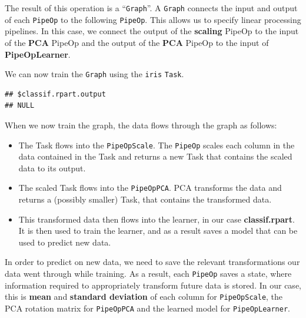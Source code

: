 \documentclass[]{scrbook}
\newenvironment{Shaded}{\begin{snugshade}}{\end{snugshade}}
\newcommand{\KeywordTok}[1]{\textcolor[rgb]{0.13,0.29,0.53}{\textbf{#1}}}
\newcommand{\NormalTok}[1]{#1}
\newcommand{\OperatorTok}[1]{\textcolor[rgb]{0.81,0.36,0.00}{\textbf{#1}}}
\newcommand{\StringTok}[1]{\textcolor[rgb]{0.31,0.60,0.02}{#1}}
\providecommand{\tightlist}{%
  \setlength{\itemsep}{0pt}\setlength{\parskip}{0pt}}
\renewenvironment{Shaded} {\begin{snugshade}\small} {\end{snugshade}}
\begin{document}
\begin{Shaded}
\end{Shaded}

The result of this operation is a ``\texttt{Graph}''.
A \texttt{Graph} connects the input and output of each \texttt{PipeOp} to the following \texttt{PipeOp}.
This allows us to specify linear processing pipelines.
In this case, we connect the output of the \textbf{scaling} PipeOp to the input of the \textbf{PCA} PipeOp and the output of the \textbf{PCA} PipeOp to the input of \textbf{PipeOpLearner}.

We can now train the \texttt{Graph} using the \texttt{iris} \texttt{Task}.

\begin{Shaded}
\end{Shaded}

\begin{verbatim}
## $classif.rpart.output
## NULL
\end{verbatim}

When we now train the graph, the data flows through the graph as follows:

\begin{itemize}
\tightlist
\item
  The Task flows into the \texttt{PipeOpScale}.
  The \texttt{PipeOp} scales each column in the data contained in the Task and returns a new Task that contains the scaled data to its output.
\item
  The scaled Task flows into the \texttt{PipeOpPCA}.
  PCA transforms the data and returns a (possibly smaller) Task, that contains the transformed data.
\item
  This transformed data then flows into the learner, in our case \textbf{classif.rpart}.
  It is then used to train the learner, and as a result saves a model that can be used to predict new data.
\end{itemize}

In order to predict on new data, we need to save the relevant transformations our data went through while training.
As a result, each \texttt{PipeOp} saves a state, where information required to appropriately transform future data is stored.
In our case, this is \textbf{mean} and \textbf{standard deviation} of each column for \texttt{PipeOpScale}, the PCA rotation matrix for \texttt{PipeOpPCA} and the learned model for \texttt{PipeOpLearner}.
\end{document}

